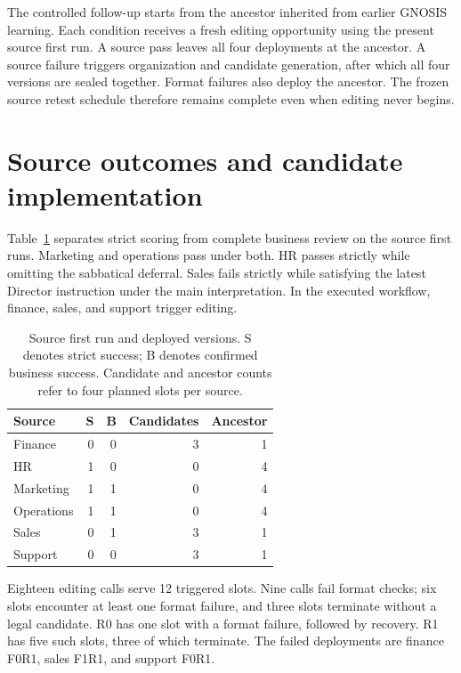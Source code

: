 \documentclass{ecai}
\begin{document}
The controlled follow-up starts from the ancestor inherited from earlier GNOSIS learning. Each condition receives a fresh editing opportunity using the present source first run. A source pass leaves all four deployments at the ancestor. A source failure triggers organization and candidate generation, after which all four versions are sealed together. Format failures also deploy the ancestor. The frozen source retest schedule therefore remains complete even when editing never begins.

\section{Source outcomes and candidate implementation}

Table~\ref{tab:sources} separates strict scoring from complete business review on the source first runs. Marketing and operations pass under both. HR passes strictly while omitting the sabbatical deferral. Sales fails strictly while satisfying the latest Director instruction under the main interpretation. In the executed workflow, finance, sales, and support trigger editing.

\begin{table}[t]
\centering
\caption{Source first run and deployed versions. S denotes strict success; B denotes confirmed business success. Candidate and ancestor counts refer to four planned slots per source.}
\label{tab:sources}
\small
\renewcommand{\arraystretch}{1.13}
\begin{tabular*}{\columnwidth}{@{\extracolsep{\fill}}lrrrr@{}}
\toprule
Source & S & B & Candidates & Ancestor\\
\midrule
Finance & 0 & 0 & 3 & 1\\
HR & 1 & 0 & 0 & 4\\
Marketing & 1 & 1 & 0 & 4\\
Operations & 1 & 1 & 0 & 4\\
Sales & 0 & 1 & 3 & 1\\
Support & 0 & 0 & 3 & 1\\
\bottomrule
\end{tabular*}
\end{table}

Eighteen editing calls serve 12 triggered slots. Nine calls fail format checks; six slots encounter at least one format failure, and three slots terminate without a legal candidate. R0 has one slot with a format failure, followed by recovery. R1 has five such slots, three of which terminate. The failed deployments are finance F0R1, sales F1R1, and support F0R1.
\end{document}
